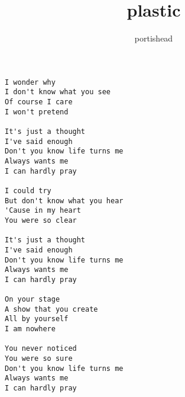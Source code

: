 \author{portishead}
\title{plastic}
\maketitle
\begin{verbatim}
I wonder why
I don't know what you see
Of course I care
I won't pretend

It's just a thought
I've said enough
Don't you know life turns me
Always wants me
I can hardly pray

I could try
But don't know what you hear
'Cause in my heart
You were so clear

It's just a thought
I've said enough
Don't you know life turns me
Always wants me
I can hardly pray

On your stage
A show that you create
All by yourself
I am nowhere

You never noticed
You were so sure
Don't you know life turns me
Always wants me
I can hardly pray
\end{verbatim}